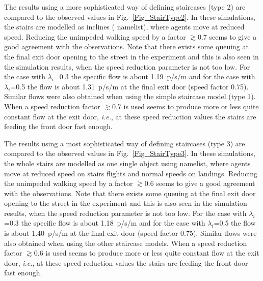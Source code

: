 \documentclass[12pt,a4paper,final,twoside]{stylevk}
\begin{document}
\begin{enumerate}
The results using a more sophisticated way of defining staircases
(type 2) are compared to the observed values in
Fig.~\ref{Fig_StairType2}.  In these simulations, the stairs are
modelled as inclines ( namelist), where agents move at
reduced speed.  Reducing the unimpeded walking speed by a factor
$\gtrsim$0.7 seems to give a good agreement with the observations.
Note that there exists some queuing at the final exit door opening to
the street in the experiment and this is also seen in the simulation
results, when the speed reduction parameter is not too low.  For the
case with $\lambda_i$=0.3 the specific flow is about 1.19~p/s/m and
for the case with $\lambda_i$=0.5 the flow is about 1.31~p/s/m at the
final exit door (speed factor 0.75).  Similar flows were also obtained
when using the simple staircase model (type 1).  When a speed
reduction factor $\gtrsim$0.7 is used seems to produce more or less
quite constant flow at the exit door, \emph{i.e.}, at these speed
reduction values the stairs are feeding the front door fast enough.
%


The results using a most sophisticated way of defining staircases
(type 3) are compared to the observed values in
Fig.~\ref{Fig_StairType3}.  In these simulations, the whole stairs are
modelled as one single object using  namelist, where
agents move at reduced speed on stairs flights and normal speeds on
landings.  Reducing the unimpeded walking speed by a factor
$\gtrsim$0.6 seems to give a good agreement with the observations.
Note that there exists some queuing at the final exit door opening to
the street in the experiment and this is also seen in the simulation
results, when the speed reduction parameter is not too low.  For the
case with $\lambda_i$=0.3 the specific flow is about 1.18~p/s/m and
for the case with $\lambda_i$=0.5 the flow is about 1.40~p/s/m at the
final exit door (speed factor 0.75).  Similar flows were also obtained
when using the other staircase models.  When a speed reduction factor
$\gtrsim$0.6 is used seems to produce more or less quite constant flow
at the exit door, \emph{i.e.}, at these speed reduction values the
stairs are feeding the front door fast enough.
%


\end{enumerate}
\end{document}

